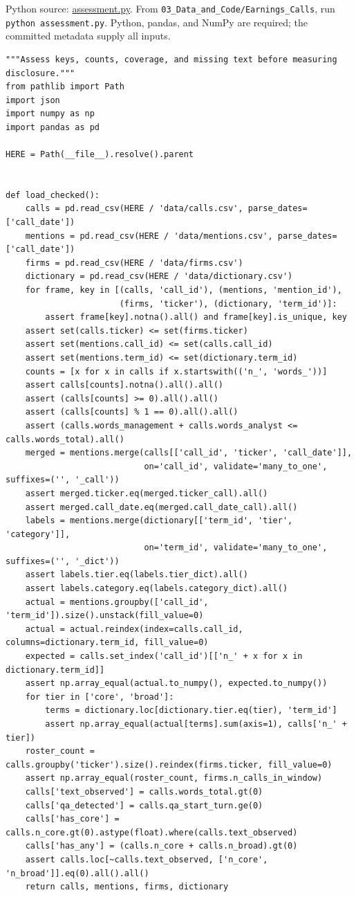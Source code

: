\FloatBarrier
{}
Python source:
\href{../03_Data_and_Code/Earnings_Calls/assessment.py}{assessment.py}.
From \texttt{03\_Data\_and\_Code/Earnings\_Calls}, run
\texttt{python\ assessment.py}. Python, pandas, and NumPy are required;
the committed metadata supply all inputs.

\begin{Verbatim}[breaklines,breakanywhere,fontsize=\small]
"""Assess keys, counts, coverage, and missing text before measuring disclosure."""
from pathlib import Path
import json
import numpy as np
import pandas as pd

HERE = Path(__file__).resolve().parent


def load_checked():
    calls = pd.read_csv(HERE / 'data/calls.csv', parse_dates=['call_date'])
    mentions = pd.read_csv(HERE / 'data/mentions.csv', parse_dates=['call_date'])
    firms = pd.read_csv(HERE / 'data/firms.csv')
    dictionary = pd.read_csv(HERE / 'data/dictionary.csv')
    for frame, key in [(calls, 'call_id'), (mentions, 'mention_id'),
                       (firms, 'ticker'), (dictionary, 'term_id')]:
        assert frame[key].notna().all() and frame[key].is_unique, key
    assert set(calls.ticker) <= set(firms.ticker)
    assert set(mentions.call_id) <= set(calls.call_id)
    assert set(mentions.term_id) <= set(dictionary.term_id)
    counts = [x for x in calls if x.startswith(('n_', 'words_'))]
    assert calls[counts].notna().all().all()
    assert (calls[counts] >= 0).all().all()
    assert (calls[counts] % 1 == 0).all().all()
    assert (calls.words_management + calls.words_analyst <= calls.words_total).all()
    merged = mentions.merge(calls[['call_id', 'ticker', 'call_date']],
                            on='call_id', validate='many_to_one', suffixes=('', '_call'))
    assert merged.ticker.eq(merged.ticker_call).all()
    assert merged.call_date.eq(merged.call_date_call).all()
    labels = mentions.merge(dictionary[['term_id', 'tier', 'category']],
                            on='term_id', validate='many_to_one', suffixes=('', '_dict'))
    assert labels.tier.eq(labels.tier_dict).all()
    assert labels.category.eq(labels.category_dict).all()
    actual = mentions.groupby(['call_id', 'term_id']).size().unstack(fill_value=0)
    actual = actual.reindex(index=calls.call_id, columns=dictionary.term_id, fill_value=0)
    expected = calls.set_index('call_id')[['n_' + x for x in dictionary.term_id]]
    assert np.array_equal(actual.to_numpy(), expected.to_numpy())
    for tier in ['core', 'broad']:
        terms = dictionary.loc[dictionary.tier.eq(tier), 'term_id']
        assert np.array_equal(actual[terms].sum(axis=1), calls['n_' + tier])
    roster_count = calls.groupby('ticker').size().reindex(firms.ticker, fill_value=0)
    assert np.array_equal(roster_count, firms.n_calls_in_window)
    calls['text_observed'] = calls.words_total.gt(0)
    calls['qa_detected'] = calls.qa_start_turn.ge(0)
    calls['has_core'] = calls.n_core.gt(0).astype(float).where(calls.text_observed)
    calls['has_any'] = (calls.n_core + calls.n_broad).gt(0)
    assert calls.loc[~calls.text_observed, ['n_core', 'n_broad']].eq(0).all().all()
    return calls, mentions, firms, dictionary



\end{Verbatim}
